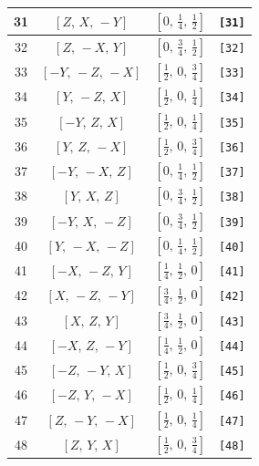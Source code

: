 \documentclass[fleqn,8pt]{jsarticle}
\begin{document}
\begin{longtable}{cccc}
31 & $\left[ Z,\, X,\, - Y \right]$ & $\left[ 0,\, \frac{1}{4},\, \frac{1}{2} \right]$ & {\tt [31]} \\ \hline
32 & $\left[ Z,\, - X,\, Y \right]$ & $\left[ 0,\, \frac{3}{4},\, \frac{1}{2} \right]$ & {\tt [32]} \\ \hline
33 & $\left[ - Y,\, - Z,\, - X \right]$ & $\left[ \frac{1}{2},\, 0,\, \frac{3}{4} \right]$ & {\tt [33]} \\ \hline
34 & $\left[ Y,\, - Z,\, X \right]$ & $\left[ \frac{1}{2},\, 0,\, \frac{1}{4} \right]$ & {\tt [34]} \\ \hline
35 & $\left[ - Y,\, Z,\, X \right]$ & $\left[ \frac{1}{2},\, 0,\, \frac{1}{4} \right]$ & {\tt [35]} \\ \hline
36 & $\left[ Y,\, Z,\, - X \right]$ & $\left[ \frac{1}{2},\, 0,\, \frac{3}{4} \right]$ & {\tt [36]} \\ \hline
37 & $\left[ - Y,\, - X,\, Z \right]$ & $\left[ 0,\, \frac{1}{4},\, \frac{1}{2} \right]$ & {\tt [37]} \\ \hline
38 & $\left[ Y,\, X,\, Z \right]$ & $\left[ 0,\, \frac{3}{4},\, \frac{1}{2} \right]$ & {\tt [38]} \\ \hline
39 & $\left[ - Y,\, X,\, - Z \right]$ & $\left[ 0,\, \frac{3}{4},\, \frac{1}{2} \right]$ & {\tt [39]} \\ \hline
40 & $\left[ Y,\, - X,\, - Z \right]$ & $\left[ 0,\, \frac{1}{4},\, \frac{1}{2} \right]$ & {\tt [40]} \\ \hline
41 & $\left[ - X,\, - Z,\, Y \right]$ & $\left[ \frac{1}{4},\, \frac{1}{2},\, 0 \right]$ & {\tt [41]} \\ \hline
42 & $\left[ X,\, - Z,\, - Y \right]$ & $\left[ \frac{3}{4},\, \frac{1}{2},\, 0 \right]$ & {\tt [42]} \\ \hline
43 & $\left[ X,\, Z,\, Y \right]$ & $\left[ \frac{3}{4},\, \frac{1}{2},\, 0 \right]$ & {\tt [43]} \\ \hline
44 & $\left[ - X,\, Z,\, - Y \right]$ & $\left[ \frac{1}{4},\, \frac{1}{2},\, 0 \right]$ & {\tt [44]} \\ \hline
45 & $\left[ - Z,\, - Y,\, X \right]$ & $\left[ \frac{1}{2},\, 0,\, \frac{3}{4} \right]$ & {\tt [45]} \\ \hline
46 & $\left[ - Z,\, Y,\, - X \right]$ & $\left[ \frac{1}{2},\, 0,\, \frac{1}{4} \right]$ & {\tt [46]} \\ \hline
47 & $\left[ Z,\, - Y,\, - X \right]$ & $\left[ \frac{1}{2},\, 0,\, \frac{1}{4} \right]$ & {\tt [47]} \\ \hline
48 & $\left[ Z,\, Y,\, X \right]$ & $\left[ \frac{1}{2},\, 0,\, \frac{3}{4} \right]$ & {\tt [48]} \\
\end{longtable}
\end{document}
